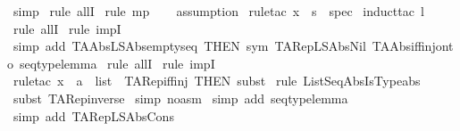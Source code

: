 \begin{isabellebody}
\isamarkupfalse%
\ simp\isanewline
{}\isamarkupfalse%
\ {\isacharparenleft}rule\ allI{\isacharparenright}\isanewline
{}\isamarkupfalse%
\ {\isacharparenleft}rule\ mp{\isacharparenright}\isanewline
{}\isamarkupfalse%
\ {}\ \isanewline
{}\isamarkupfalse%
\ {\isacharparenleft}assumption{\isacharparenright}\isanewline
{}\isamarkupfalse%
\ {\isacharparenleft}rule{\isacharunderscore}tac\ x\ {\isacharequal}\ {\isachardoublequoteopen}s{\isachardoublequoteclose}\ \ spec{\isacharparenright}\isanewline
{}\isamarkupfalse%
\ {\isacharparenleft}induct{\isacharunderscore}tac\ {\isachardoublequoteopen}l{\isachardoublequoteclose}{\isacharparenright}\isanewline
{}\isamarkupfalse%
\ {\isacharparenleft}rule\ allI{\isacharparenright}\isanewline
{}\isamarkupfalse%
\ {\isacharparenleft}rule\ impI{\isacharparenright}\isanewline
{}\isamarkupfalse%
\ {\isacharparenleft}simp\ add{\isacharcolon}\ TAAbs{\isacharunderscore}LSAbs{\isacharunderscore}emptyseq\ {\isacharbrackleft}THEN\ sym{\isacharbrackright}\ TARep{\isacharunderscore}LSAbs{\isacharunderscore}Nil\ TAAbs{\isacharunderscore}iff{\isacharunderscore}inj{\isacharunderscore}onto\ seqtype{\isacharunderscore}lemma{\isacharparenright}\isanewline
{}\isamarkupfalse%
\ {\isacharparenleft}rule\ allI{\isacharparenright}\isanewline
{}\isamarkupfalse%
\ {\isacharparenleft}rule\ impI{\isacharparenright}\isanewline
{}\isamarkupfalse%
\ {\isacharparenleft}rule{\isacharunderscore}tac\ x{}\ {\isacharequal}\ {\isachardoublequoteopen}a\ {\isacharhash}\ list{\isachardoublequoteclose}\ \ TARep{\isacharunderscore}iff{\isacharunderscore}inj\ {\isacharbrackleft}THEN\ subst{\isacharbrackright}{\isacharparenright}\isanewline
{}\isamarkupfalse%
\ {\isacharparenleft}rule\ ListSeqAbsIsTypeabs{\isacharparenright}\isanewline
{}\isamarkupfalse%
\ {\isacharparenleft}subst\ TARep{\isacharunderscore}inverse{\isacharparenright}\isanewline
{}\isamarkupfalse%
\ {\isacharparenleft}simp\ {\isacharparenleft}no{\isacharunderscore}asm{\isacharparenright}{\isacharparenright}\isanewline
{}\isamarkupfalse%
\ {\isacharparenleft}simp\ add{\isacharcolon}\ seqtype{\isacharunderscore}lemma{\isacharparenright}\isanewline
{}\isamarkupfalse%
\ {\isacharparenleft}simp\ add{\isacharcolon}\ TARep{\isacharunderscore}LSAbs{\isacharunderscore}Cons{\isacharparenright}\isanewline

\end{isabellebody}
